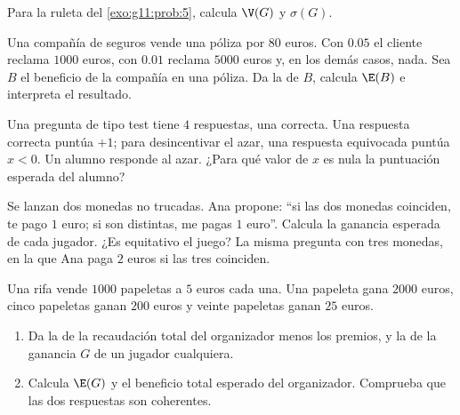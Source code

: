 \begin{exercise}[$\star\star$]\label{exo:g11:prob:7}
Para la ruleta del \cref{exo:g11:prob:5}, calcula $\V(G)$ y $\sigma(G)$.
\end{exercise}

\begin{exercise}[$\star\star$]\label{exo:g11:prob:8}
Una compañía de seguros vende una póliza por $80$ euros. Con 
$0.05$ el cliente reclama $1000$ euros, con  $0.01$ reclama
$5000$ euros y, en los demás casos, nada. Sea $B$ el beneficio de la
compañía en una póliza. Da la  de $B$, calcula $\E(B)$ e
interpreta el resultado.
\end{exercise}

\begin{exercise}[$\star\star$]\label{exo:g11:prob:9}
Una pregunta de tipo test tiene $4$ respuestas, una correcta. Una
respuesta correcta puntúa $+1$; para desincentivar el azar, una respuesta
equivocada puntúa $x < 0$. Un alumno responde al azar. ¿Para qué valor de
$x$ es nula la puntuación esperada del alumno?
\end{exercise}

\begin{exercise}[$\star\star$]\label{exo:g11:prob:10}
Se lanzan dos monedas no trucadas. Ana propone: ``si las dos monedas
coinciden, te pago $1$ euro; si son distintas, me pagas $1$ euro''.
Calcula la ganancia esperada de cada jugador. ¿Es equitativo el juego? La
misma pregunta con tres monedas, en la que Ana paga $2$ euros si las tres
coinciden.
\end{exercise}

\begin{exercise}[$\star\star\star$]\label{exo:g11:prob:11}
Una rifa vende $1000$ papeletas a $5$ euros cada una. Una papeleta gana
$2000$ euros, cinco papeletas ganan $200$ euros y veinte papeletas ganan
$25$ euros.
\begin{enumerate}
  \item Da la  de la recaudación total del organizador menos
        los premios, y la de la ganancia $G$ de un jugador cualquiera.
  \item Calcula $\E(G)$ y el beneficio total esperado del organizador.
        Comprueba que las dos respuestas son coherentes.
\end{enumerate}
\end{exercise}

